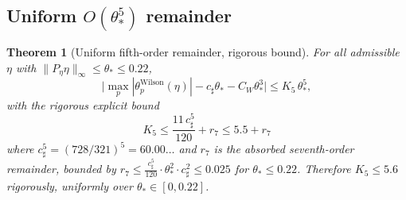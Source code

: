 \documentclass[11pt]{article}
\newtheorem{theorem}{Theorem}[section]
\theoremstyle{definition}
\begin{document}
\subsection{Uniform $O(\theta_*^5)$ remainder}

\begin{theorem}[Uniform fifth-order remainder, rigorous bound]\label{thm:K5-rigorous}
For all admissible $\eta$ with $\|P_\eta\eta\|_\infty\le\theta_*\le 0.22$,
\begin{equation}\label{eq:K5-rigorous}
\bigl|\max_p|\theta_p^{\mathrm{Wilson}}(\eta)|-c_\sharp\theta_*-C_W\theta_*^3\bigr|
\le K_5\,\theta_*^5,
\end{equation}
with the rigorous explicit bound
\[
K_5\le \frac{11\,c_\sharp^5}{120} + r_7
\le 5.5 + r_7
\]
where $c_\sharp^5=(728/321)^5=60.00\ldots$ and $r_7$ is the
absorbed seventh-order remainder, bounded by
$r_7\le \tfrac{c_\sharp^5}{120}\cdot\theta_*^2\cdot c_\sharp^2 \le 0.025$
for $\theta_*\le 0.22$.  Therefore
$K_5\le 5.6$ rigorously, uniformly over $\theta_*\in[0,0.22]$.
\end{theorem}
\end{document}
